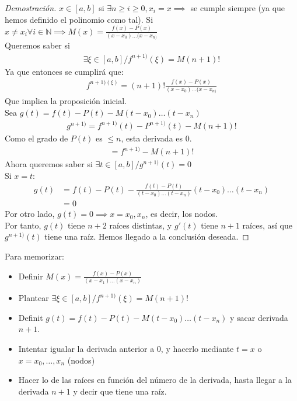 \documentclass{article}
\begin{document}
\begin{proof}[Demostración]
	$x \in [a,b]$ si $\exists n \geq i \geq 0, x_{i} = x \implies $ se cumple siempre (ya que hemos definido el polinomio como tal).
	Si $x \neq x_{i} \forall i \in \mathbb{N} \implies
	M(x) = \frac{f(x)-P(x)}{(x-x_{0})\dots(x-x_{n)}}$\\
	Queremos saber si
	\begin{equation}
		\begin{split}
			\exists \xi \in [a,b] / f^{n+1)}(\xi)=M(n+1)!
		\end{split}
	\end{equation}
	Ya que entonces se cumplirá que:
	\begin{equation}
		\begin{split}
			f^{n+1)(\xi)}=(n+1)!\frac{f(x)-P(x)}{(x-x_{0})\dots(x-x_{n)}}
		\end{split}
	\end{equation}
	Que implica la proposición inicial.\\
	Sea $g(t)=f(t)-P(t) - M(t-x_{0})\dots (t-x_{n})$
	\begin{equation}
		\begin{split}
			g^{n+1)}=f^{n+1)}(t)-P^{n+1)}(t)-M(n+1)!
		\end{split}
	\end{equation}
	Como el grado de $P(t)$ es $\leq n$, esta derivada es $0$.
	\begin{equation}
		\begin{split}
			= f^{n+1)}-M(n+1)!
		\end{split}
	\end{equation}
	Ahora queremos saber si $\exists t \in[a,b] / g^{n+1)}(t)=0$\\
	Si $x=t$:
	\begin{equation}
		\begin{split}
			g(t)&=f(t)-P(t)- \frac{f(t)-P(t)}{(t-x_{0})\dots(t-x_{n})}
			(t-x_{0})\dots(t-x_{n})\\
			    &=0
		\end{split}
	\end{equation}
	Por otro lado, $g(t)=0 \implies x=x_{0},x_{n}$, es decir, los nodos.\\
	Por tanto, $g(t)$ tiene $n+2$ raíces distintas, y $g'(t)$ tiene $n+1$ raíces,
	así que $g^{n+1)}(t)$ tiene una raíz. Hemos llegado a la conclusión deseada. 
\end{proof}
Para memorizar:
\begin{itemize}
	\item Definir $M(x) = \frac{f(x)-P(x)}{(x-x_{1})\dots(x-x_{n})}$
	\item Plantear $\exists \xi \in [a,b] / f^{n+1)}(\xi)=M(n+1
    )!$
    	\item Definit $g(t)=f(t)-P(t) - M(t-x_{0})\dots (t-x_{n})$ y sacar derivada $n+1$.
	\item Intentar igualar la derivada anterior a $0$, y hacerlo mediante $t=x$ o $x=x_{0},\dots,x_{n}$ (nodos)
	\item Hacer lo de las raíces en función del número de la derivada, hasta llegar a la derivada $n+1$ y decir que tiene una raíz. 
\end{itemize}
\end{document}
